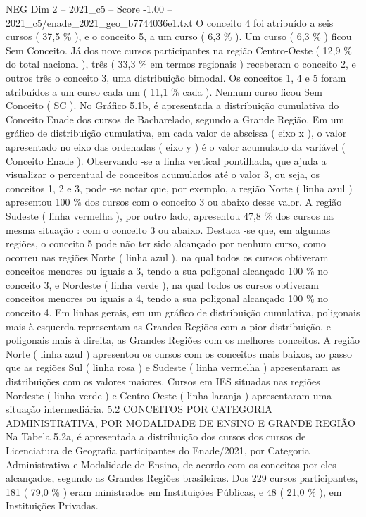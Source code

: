 \begin{textsample}{NEG Dim 2 – 2021\_c5 – Score -1.00 – 2021\_c5/enade\_2021\_geo\_b7744036e1.txt}
O conceito 4 foi atribuído a seis cursos ( 37,5 \% ), e o conceito 5, a um curso ( 6,3 \% ).
Um curso ( 6,3 \% ) ficou Sem Conceito.
Já dos nove cursos participantes na região Centro-Oeste ( 12,9 \% do total nacional ), três ( 33,3 \% em termos regionais ) receberam o conceito 2, e outros três o conceito 3, uma distribuição bimodal.
Os conceitos 1, 4 e 5 foram atribuídos a um curso cada um ( 11,1 \% cada ).
Nenhum curso ficou Sem Conceito ( SC ).
No Gráfico 5.1b, é apresentada a distribuição cumulativa do Conceito Enade dos cursos de Bacharelado, segundo a Grande Região.
Em um gráfico de distribuição cumulativa, em cada valor de abscissa ( eixo x ), o valor apresentado no eixo das ordenadas ( eixo y ) é o valor acumulado da variável ( Conceito Enade ).
Observando -se a linha vertical pontilhada, que ajuda a visualizar o percentual de conceitos acumulados até o valor 3, ou seja, os conceitos 1, 2 e 3, pode -se notar que, por exemplo, a região Norte ( linha azul ) apresentou 100 \% dos cursos com o conceito 3 ou abaixo desse valor.
A região Sudeste ( linha vermelha ), por outro lado, apresentou 47,8 \% dos cursos na mesma situação : com o conceito 3 ou abaixo.
Destaca -se que, em algumas regiões, o conceito 5 pode não ter sido alcançado por nenhum curso, como ocorreu nas regiões Norte ( linha azul ), na qual todos os cursos obtiveram conceitos menores ou iguais a 3, tendo a sua poligonal alcançado 100 \% no conceito 3, e Nordeste ( linha verde ), na qual todos os cursos obtiveram conceitos menores ou iguais a 4, tendo a sua poligonal alcançado 100 \% no conceito 4.
Em linhas gerais, em um gráfico de distribuição cumulativa, poligonais mais à esquerda representam as Grandes Regiões com a pior distribuição, e poligonais mais à direita, as Grandes Regiões com os melhores conceitos.
A região Norte ( linha azul ) apresentou os cursos com os conceitos mais baixos, ao passo que as regiões Sul ( linha rosa ) e Sudeste ( linha vermelha ) apresentaram as distribuições com os valores maiores.
Cursos em IES situadas nas regiões Nordeste ( linha verde ) e Centro-Oeste ( linha laranja ) apresentaram uma situação intermediária. 5.2 CONCEITOS POR CATEGORIA ADMINISTRATIVA, POR MODALIDADE DE ENSINO E GRANDE REGIÃO Na Tabela 5.2a, é apresentada a distribuição dos cursos dos cursos de Licenciatura de Geografia participantes do Enade/2021, por Categoria Administrativa e Modalidade de Ensino, de acordo com os conceitos por eles alcançados, segundo as Grandes Regiões brasileiras.
Dos 229 cursos participantes, 181 ( 79,0 \% ) eram ministrados em Instituições Públicas, e 48 ( 21,0 \% ), em Instituições Privadas.

\end{textsample}
